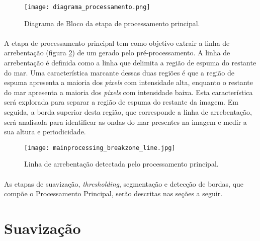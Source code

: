 \begin{figure}[h]
\begin{center}
  \texttt{[image: diagrama\_processamento.png]}
  \caption[\small{Diagrama de Bloco da etapa de processamento principal.}]{\label{FigDiagramaProc} \small{Diagrama de Bloco da etapa de processamento principal.}}
\end{center}
\end{figure}

\paragraph{}A etapa de processamento principal tem como objetivo extrair a linha de arrebentação (figura \ref{FigLinhaArrebentacao}) de um \timestack gerado pelo pré-processamento. A linha de arrebentação é definida como a linha que delimita a região de espuma do restante do mar. Uma característica marcante dessas duas regiões é que a região de espuma apresenta a maioria dos \textit{pixels} com intensidade alta, enquanto o restante do mar apresenta a maioria dos \textit{pixels} com intensidade baixa. Esta característica será explorada para separar a região de espuma do restante da imagem. Em seguida, a borda superior desta região, que corresponde a linha de arrebentação, será analisada para identificar as ondas do mar presentes na imagem e medir a sua altura e periodicidade.


\begin{figure}[h]
\begin{center}
  \texttt{[image: mainprocessing\_breakzone\_line.jpg]}
  \caption[\small{Linha de arrebentação detectada pelo processamento principal.}]{\label{FigLinhaArrebentacao} \small{Linha de arrebentação detectada pelo processamento principal.}}
\end{center}
\end{figure}

\paragraph{}As etapas de suavização, \textit{thresholding}, segmentação e detecção de bordas, que compõe o Processamento Principal, serão descritas nas seções a seguir.

\section{Suavização}

